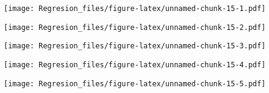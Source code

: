 \documentclass[]{article}
\newenvironment{Shaded}{\begin{snugshade}}{\end{snugshade}}
\newcommand{\DataTypeTok}[1]{\textcolor[rgb]{0.13,0.29,0.53}{#1}}
\newcommand{\KeywordTok}[1]{\textcolor[rgb]{0.13,0.29,0.53}{\textbf{#1}}}
\newcommand{\NormalTok}[1]{#1}
\newcommand{\OperatorTok}[1]{\textcolor[rgb]{0.81,0.36,0.00}{\textbf{#1}}}
\newcommand{\StringTok}[1]{\textcolor[rgb]{0.31,0.60,0.02}{#1}}
\begin{document}
\texttt{[image: Regresion\_files/figure-latex/unnamed-chunk-15-1.pdf]}

\begin{Shaded}
\end{Shaded}

\texttt{[image: Regresion\_files/figure-latex/unnamed-chunk-15-2.pdf]}

\begin{Shaded}
\end{Shaded}

\texttt{[image: Regresion\_files/figure-latex/unnamed-chunk-15-3.pdf]}

\begin{Shaded}
\end{Shaded}

\texttt{[image: Regresion\_files/figure-latex/unnamed-chunk-15-4.pdf]}

\begin{Shaded}
\end{Shaded}

\texttt{[image: Regresion\_files/figure-latex/unnamed-chunk-15-5.pdf]}

\begin{Shaded}
\end{Shaded}
\end{document}
